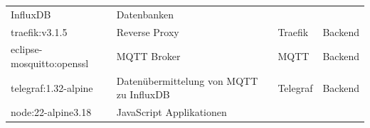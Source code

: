 \documentclass[
    headings=optiontotocandhead,%
    twoside,
    numbers=noenddot,%
    12pt, %
    titlepage, %
    parskip=full, %
    listof=leveldown, 
    numbers=noenddot, %
    a4paper,DIV=14,
    BCOR=15mm,
]{scrbook}
\begin{document}
\begin{longtable}[]{@{}llll@{}}
\begin{minipage}[t]{0.22\columnwidth}
InfluxDB\strut
\end{minipage} & \begin{minipage}[t]{0.22\columnwidth}\raggedright
Datenbanken\strut
\end{minipage}\tabularnewline
\begin{minipage}[t]{0.22\columnwidth}\raggedright
traefik:v3.1.5\strut
\end{minipage} & \begin{minipage}[t]{0.22\columnwidth}\raggedright
Reverse Proxy\strut
\end{minipage} & \begin{minipage}[t]{0.22\columnwidth}\raggedright
Traefik\strut
\end{minipage} & \begin{minipage}[t]{0.22\columnwidth}\raggedright
Backend\strut
\end{minipage}\tabularnewline
\begin{minipage}[t]{0.22\columnwidth}\raggedright
eclipse-mosquitto:openssl\strut
\end{minipage} & \begin{minipage}[t]{0.22\columnwidth}\raggedright
MQTT Broker\strut
\end{minipage} & \begin{minipage}[t]{0.22\columnwidth}\raggedright
MQTT\strut
\end{minipage} & \begin{minipage}[t]{0.22\columnwidth}\raggedright
Backend\strut
\end{minipage}\tabularnewline
\begin{minipage}[t]{0.22\columnwidth}\raggedright
telegraf:1.32-alpine\strut
\end{minipage} & \begin{minipage}[t]{0.22\columnwidth}\raggedright
Datenübermittelung von MQTT zu InfluxDB\strut
\end{minipage} & \begin{minipage}[t]{0.22\columnwidth}\raggedright
Telegraf\strut
\end{minipage} & \begin{minipage}[t]{0.22\columnwidth}\raggedright
Backend\strut
\end{minipage}\tabularnewline
\begin{minipage}[t]{0.22\columnwidth}\raggedright
node:22-alpine3.18\strut
\end{minipage} & \begin{minipage}[t]{0.22\columnwidth}\raggedright
JavaScript Applikationen\strut
\end{minipage} & \begin{minipage}[t]{0.22\columnwidth}\raggedright

\end{minipage}
\end{longtable}
\end{document}
